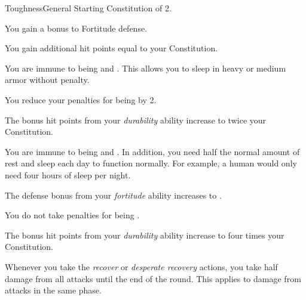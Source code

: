     \begin{feat}{Toughness}{General}
        \featpre Starting Constitution of 2.
        \featben

         You gain a  bonus to Fortitude defense.

         You gain additional hit points equal to your Constitution.

         You are immune to being  and .
        This allows you to sleep in heavy or medium armor without penalty.

         You reduce your penalties for being  by 2.

         The bonus hit points from your \textit{durability} ability increase to twice your Constitution.

         You are immune to being  and .
        In addition, you need half the normal amount of rest and sleep each day to function normally.
        For example, a human would only need four hours of sleep per night.

         The defense bonus from your \textit{fortitude} ability increases to .

         You do not take penalties for being .

         The bonus hit points from your \textit{durability} ability increase to four times your Constitution.

         Whenever you take the \textit{recover} or \textit{desperate recovery} actions, you take half damage from all attacks until the end of the round.
        This applies to damage from attacks in the same phase.
    \end{feat}

